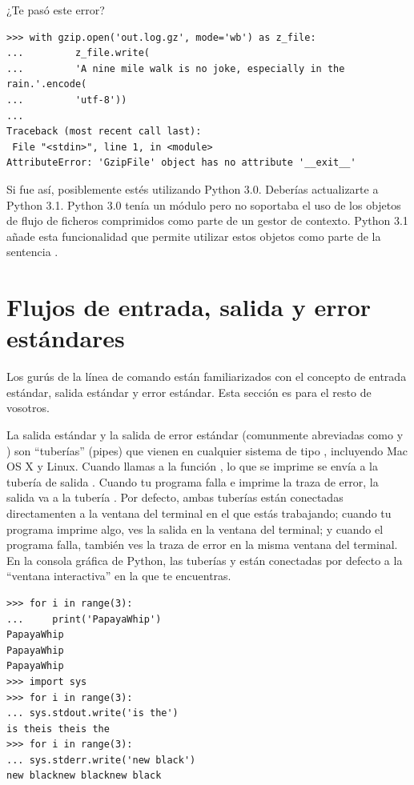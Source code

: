 ¿Te pasó este error?

\noindent\begin{minipage}{\textwidth}
\begin{lstlisting}[mathescape=True]
>>> with gzip.open('out.log.gz', mode='wb') as z_file:
...         z_file.write(
...         'A nine mile walk is no joke, especially in the rain.'.encode(
...         'utf-8'))
... 
Traceback (most recent call last):
 File "<stdin>", line 1, in <module>
AttributeError: 'GzipFile' object has no attribute '__exit__'
\end{lstlisting}
\end{minipage}

Si fue así, posiblemente estés utilizando Python 3.0. Deberías actualizarte a Python 3.1.
Python 3.0 tenía un módulo  pero no soportaba el uso de los objetos de flujo de ficheros comprimidos como parte de un gestor de contexto. Python 3.1 añade esta funcionalidad que permite utilizar estos objetos como parte de la sentencia .

\section{Flujos de entrada, salida y error estándares}

Los gurús de la línea de comando están familiarizados con el concepto de entrada estándar, salida estándar y error estándar. Esta sección es para el resto de vosotros.


La salida estándar y la salida de error estándar (comunmente abreviadas como  y ) son ``tuberías'' (pipes) que vienen en cualquier sistema de tipo , incluyendo Mac OS X y Linux. Cuando llamas a la función , lo que se imprime se envía a la tubería de salida . Cuando tu programa falla e imprime la traza de error, la salida va a la tubería . Por defecto, ambas tuberías están conectadas directamenten a la ventana del terminal en el que estás trabajando; cuando tu programa imprime algo, ves la salida en la ventana del terminal; y cuando el programa falla, también ves la traza de error en la misma ventana del terminal. En la consola gráfica de Python, las tuberías  y  están conectadas por defecto a la ``ventana interactiva'' en la que te encuentras.

\noindent\begin{minipage}{\textwidth}
\begin{lstlisting}[mathescape=True]
>>> for i in range(3):
...     print('PapayaWhip')
PapayaWhip
PapayaWhip
PapayaWhip
>>> import sys
>>> for i in range(3):
... sys.stdout.write('is the')
is theis theis the
>>> for i in range(3):
... sys.stderr.write('new black')
new blacknew blacknew black
\end{lstlisting}
\end{minipage}

